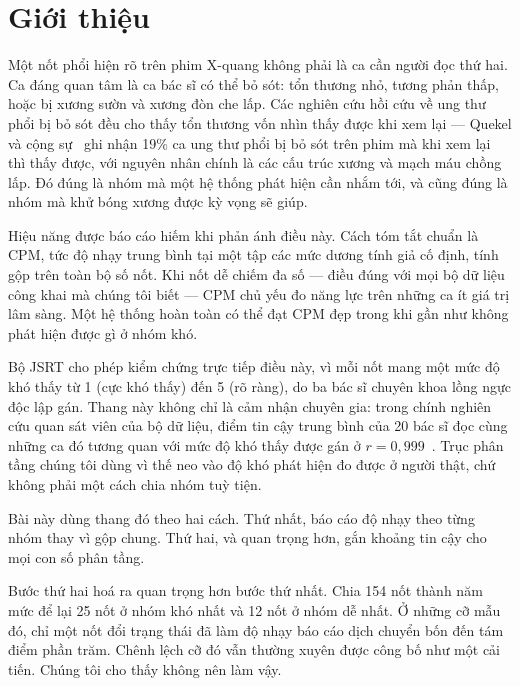 \documentclass[12pt,a4paper]{article}
\begin{document}
\section{Giới thiệu}

Một nốt phổi hiện rõ trên phim X-quang không phải là ca cần người đọc thứ hai.
Ca đáng quan tâm là ca bác sĩ có thể bỏ sót: tổn thương nhỏ, tương phản thấp,
hoặc bị xương sườn và xương đòn che lấp. Các nghiên cứu hồi cứu về ung thư phổi
bị bỏ sót đều cho thấy tổn thương vốn nhìn thấy được khi xem lại --- Quekel và
cộng sự~\cite{quekel1999missrate} ghi nhận 19\% ca ung thư phổi bị bỏ sót trên
phim mà khi xem lại thì thấy được, với nguyên nhân chính là các cấu trúc xương
và mạch máu chồng lấp. Đó đúng là nhóm mà một hệ thống phát hiện cần nhắm tới,
và cũng đúng là nhóm mà khử bóng xương được kỳ vọng sẽ giúp.

Hiệu năng được báo cáo hiếm khi phản ánh điều này. Cách tóm tắt chuẩn là CPM,
tức độ nhạy trung bình tại một tập các mức dương tính giả cố định, tính gộp trên
toàn bộ số nốt. Khi nốt dễ chiếm đa số --- điều đúng với mọi bộ dữ liệu công
khai mà chúng tôi biết --- CPM chủ yếu đo năng lực trên những ca ít giá trị lâm
sàng. Một hệ thống hoàn toàn có thể đạt CPM đẹp trong khi gần như không phát
hiện được gì ở nhóm khó.

Bộ JSRT cho phép kiểm chứng trực tiếp điều này, vì mỗi nốt mang một mức độ khó
thấy từ 1 (cực khó thấy) đến 5 (rõ ràng), do ba bác sĩ chuyên khoa lồng ngực độc
lập gán. Thang này không chỉ là cảm nhận chuyên gia: trong chính nghiên cứu quan
sát viên của bộ dữ liệu, điểm tin cậy trung bình của 20 bác sĩ đọc cùng những ca
đó tương quan với mức độ khó thấy được gán ở $r = 0{,}999$~\cite{shiraishi2000jsrt}.
Trục phân tầng chúng tôi dùng vì thế neo vào độ khó phát hiện đo được ở người
thật, chứ không phải một cách chia nhóm tuỳ tiện.

Bài này dùng thang đó theo hai cách. Thứ nhất, báo cáo độ nhạy theo từng nhóm
thay vì gộp chung. Thứ hai, và quan trọng hơn, gắn khoảng tin cậy cho mọi con số
phân tầng.

Bước thứ hai hoá ra quan trọng hơn bước thứ nhất. Chia 154 nốt thành năm mức để
lại 25 nốt ở nhóm khó nhất và 12 nốt ở nhóm dễ nhất. Ở những cỡ mẫu đó, chỉ một
nốt đổi trạng thái đã làm độ nhạy báo cáo dịch chuyển bốn đến tám điểm phần trăm.
Chênh lệch cỡ đó vẫn thường xuyên được công bố như một cải tiến. Chúng tôi cho
thấy không nên làm vậy.
\end{document}
